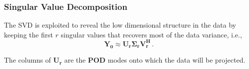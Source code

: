 \documentclass[fleqn]{beamer}
\begin{document}
\begin{frame}
\frametitle{Singular Value Decomposition}

 
The SVD is exploited to reveal the low dimensional structure in the data by keeping the first $r$ singular values that recovers most of the data variance, i.e.,
\begin{equation*}
 \mathbf{Y_0} \approx \mathbf{U_r}\boldsymbol{\Sigma}_{\mathbf{r}}\mathbf{V_r^{H}} \, .
\end{equation*}


The columns of {$\mathbf{U_r}$} are the {\bf POD} modes onto which the data will be projected.  


\end{frame}

\end{document}
